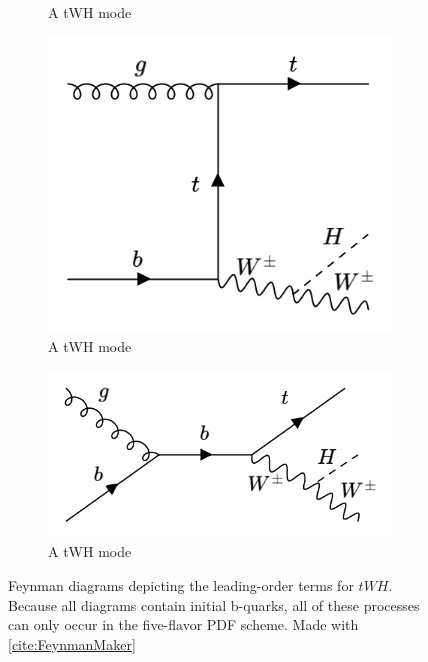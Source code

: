 \begin{figure}[htp]
\begin{subfigure}[b]{0.3\textwidth}
         \caption{A tWH mode}
         \label{fig:tWH3}
     \end{subfigure}
     \hfill
         \begin{subfigure}[b]{0.3\textwidth}
         \centering
         \includegraphics[width=\textwidth]{figures/theory_chapter/tWH4.png}
         \caption{A tWH mode}
         \label{fig:tWH4}
     \end{subfigure}
     \hfill
         \begin{subfigure}[b]{0.3\textwidth}
         \centering
         \includegraphics[width=\textwidth]{figures/theory_chapter/tWH5.png}
         \caption{A tWH mode}
         \label{fig:tWH5}
     \end{subfigure}
  \label{fig:tWHmodes}
  \caption{Feynman diagrams depicting the leading-order terms for $tWH$. Because all diagrams contain initial b-quarks, all of these processes can only occur in the five-flavor PDF scheme. Made with \ref{cite:FeynmanMaker}}  
\end{figure}

